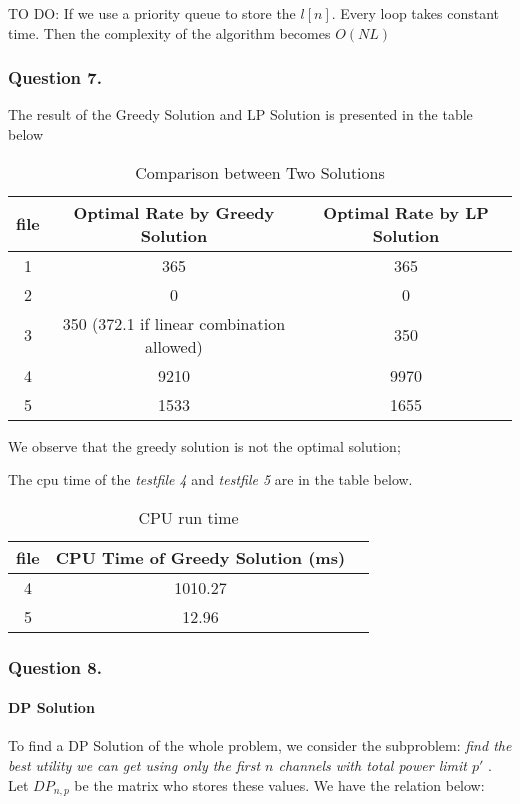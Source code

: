 \documentclass[11pt, oneside]{report}
\begin{document}
TO DO: If we use a priority queue to store the $l[n]$. Every loop takes constant time. Then the complexity of the algorithm becomes $O(N L)$

\subsubsection{Question 7. }
The result of the Greedy Solution and LP Solution is presented in the table below 

\begin{table}[!htbp]
\centering
\begin{tabular}{|c|c|c|}%
\hline
file & Optimal Rate by Greedy Solution & Optimal Rate by LP Solution  \\
\hline
1 & 365 & 365\\
\hline
2 & 0 & 0\\
\hline
3 & 350 (372.1 if linear combination allowed) & 350\\
\hline
4 & 9210 & 9970\\
\hline
5 & 1533 & 1655\\
\hline
\end{tabular}
\caption{Comparison between Two Solutions} 
\end{table}

We observe that the greedy solution is not the optimal solution;

The cpu time of the \textit{testfile 4} and \textit{testfile 5} are in the table below.

\begin{table}[!htbp]
\centering
\begin{tabular}{|c|c|c|}%
\hline
file & CPU Time of Greedy Solution (ms)  \\
\hline
4 &  1010.27\\
\hline
5 & 12.96\\
\hline
\end{tabular}
\caption{CPU run time} 
\end{table}

\subsubsection{Question 8. }
\paragraph{DP Solution} To find a DP Solution of the whole problem, we consider the subproblem: \textit{find the best utility we can get using only the first $n$ channels with total power limit $p'$ }. Let $DP_{n,p}$ be the matrix who stores these values. We have the relation below: 
\end{document}
